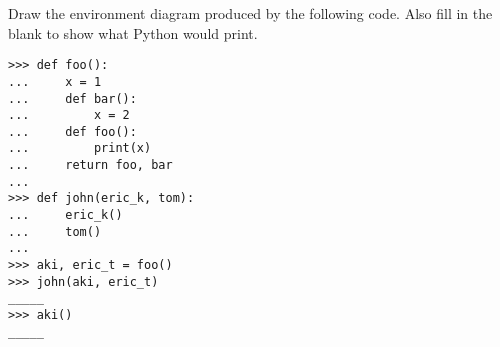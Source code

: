 \documentclass[10pt]{article}
\begin{document}

Draw the environment diagram produced by the following code. Also fill in the
blank to show what Python would print.

\begin{verbatim}
>>> def foo():
...     x = 1
...     def bar():
...         x = 2
...     def foo():
...         print(x)
...     return foo, bar
...
>>> def john(eric_k, tom):
...     eric_k()
...     tom()
...
>>> aki, eric_t = foo()
>>> john(aki, eric_t)
_____
>>> aki()
_____
\end{verbatim}
\end{document}
